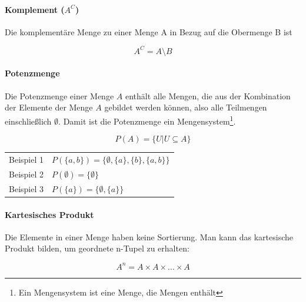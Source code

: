 \documentclass[../main.tex]{subfiles}
\begin{document}
                \paragraph{Komplement ($A^C$)}
                    Die komplementäre Menge zu einer Menge A in Bezug auf die Obermenge B ist
                    
                    \begin{equation}
                        A^C = A \setminus B
                    \end{equation}
                    
                \paragraph{Potenzmenge}
                    Die Potenzmenge einer Menge $A$ enthält alle Mengen, die aus der Kombination der Elemente der Menge $A$ gebildet werden können, also alle Teilmengen einschließlich $\emptyset$. Damit ist die Potenzmenge ein Mengensystem\footnote{Ein Mengensystem ist eine Menge, die Mengen enthält}.
                    
                    \begin{equation}
                        P(A) = \{U | U \subseteq A\}
                    \end{equation}
                    
                    \begin{tabular}{ r l }
                        Beispiel 1 & $P\left(\{a, b\}\right) = \{\emptyset, \{a\}, \{b\}, \{a, b\}\}$\\
                        Beispiel 2 & $P\left(\emptyset\right) = \{\emptyset\}$\\
                        Beispiel 3 & $P\left(\{a\}\right) = \{\emptyset, \{a\}\}$
    	    	    \end{tabular}
                    
                \paragraph{Kartesisches Produkt}
                    Die Elemente in einer Menge haben keine Sortierung. Man kann das kartesische Produkt bilden, um geordnete n-Tupel zu erhalten:
                    
                    \begin{equation}
                        A^n = A \times A \times ... \times A
                    \end{equation}
                    
\end{document}

